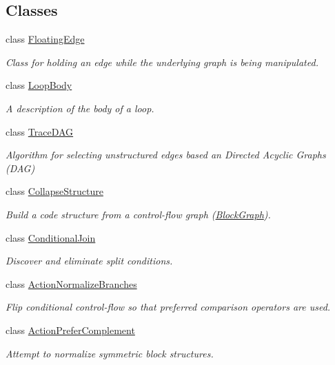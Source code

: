 \subsection*{Classes}
\begin{DoxyCompactItemize}
\item 
class \mbox{\hyperlink{class_floating_edge}{Floating\+Edge}}
\begin{DoxyCompactList}\small\item\em Class for holding an edge while the underlying graph is being manipulated. \end{DoxyCompactList}\item 
class \mbox{\hyperlink{class_loop_body}{Loop\+Body}}
\begin{DoxyCompactList}\small\item\em A description of the body of a loop. \end{DoxyCompactList}\item 
class \mbox{\hyperlink{class_trace_d_a_g}{Trace\+D\+AG}}
\begin{DoxyCompactList}\small\item\em Algorithm for selecting unstructured edges based an Directed Acyclic Graphs (D\+AG) \end{DoxyCompactList}\item 
class \mbox{\hyperlink{class_collapse_structure}{Collapse\+Structure}}
\begin{DoxyCompactList}\small\item\em Build a code structure from a control-\/flow graph (\mbox{\hyperlink{class_block_graph}{Block\+Graph}}). \end{DoxyCompactList}\item 
class \mbox{\hyperlink{class_conditional_join}{Conditional\+Join}}
\begin{DoxyCompactList}\small\item\em Discover and eliminate {\itshape split} conditions. \end{DoxyCompactList}\item 
class \mbox{\hyperlink{class_action_normalize_branches}{Action\+Normalize\+Branches}}
\begin{DoxyCompactList}\small\item\em Flip conditional control-\/flow so that {\itshape preferred} comparison operators are used. \end{DoxyCompactList}\item 
class \mbox{\hyperlink{class_action_prefer_complement}{Action\+Prefer\+Complement}}
\begin{DoxyCompactList}\small\item\em Attempt to normalize symmetric block structures. \end{DoxyCompactList}\item 

\end{DoxyCompactItemize}
